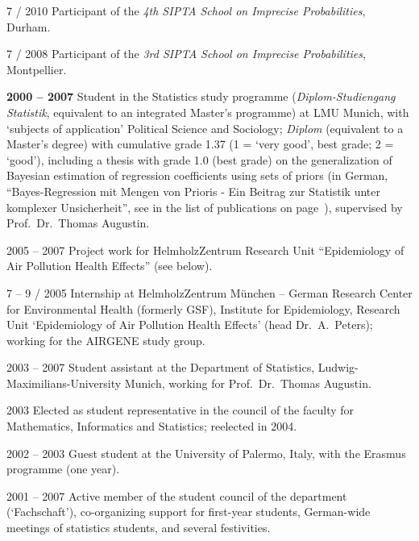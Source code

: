 \documentclass[a4paper]{simplecv}
\begin{document}
\begin{topic}
\item[7 / 2010] Participant of the \emph{4th SIPTA School on Imprecise Probabilities}, Durham. %

\item[7 / 2008] Participant of the \emph{3rd SIPTA School on Imprecise Probabilities}, Montpellier. %

\item[\hspace*{-2ex}\bfseries 2000 -- 2007] Student in the Statistics study programme %
(\emph{Di\-plom-Studiengang Statistik}, equivalent to an integrated Master's programme) %
at LMU Munich,
with `subjects of application' Political Science and Sociology;
%
\emph{Diplom} (equivalent to a Master's degree) with cumulative grade 1.37
(1 = `very good', best grade; 2 = `good'), including a thesis
with grade 1.0 (best grade) %
on the generalization of Bayesian estimation of regression coefficients using sets of priors
(in German, ``Bayes-Regression mit Mengen von Prioris - Ein Beitrag zur Statistik unter komplexer Unsicherheit'',
see \cite{Walter2006a} in the list of publications on page~\pageref{publications}),
supervised by Prof.\ Dr.\ Thomas Augustin.

\item[2005 -- 2007] Project work for HelmholzZentrum Research Unit ``Epidemiology of Air Pollution Health Effects'' (see below).

\item[7 -- 9 / 2005] Internship at HelmholzZentrum M\"unchen -- German Research Center for Environmental Health (formerly GSF),
Institute for Epidemiology, Research Unit `Epidemiology of Air Pollution Health Effects' (head Dr.\ A.\ Peters);
working for the AIRGENE study group.

\item[2003 -- 2007] Student assistant at the Department of Statistics, Ludwig-Maximi\-li\-ans-Uni\-ver\-si\-ty Munich,
working for Prof.\ Dr.\ Thomas Augustin.

\item[2003] Elected as student representative in the council of the faculty for Mathematics, Informatics and Statistics; reelected in 2004.

\item[2002 -- 2003] Guest student at the University of Palermo, Italy, with the Erasmus programme (one year). %

\item[2001 -- 2007] Active member of the student council of the department (`Fachschaft'),
co-organizing support for first-year students, German-wide meetings of statistics students, and several festivities.

\end{topic}
\end{document}
